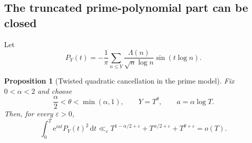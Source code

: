 \documentclass[11pt]{amsart}
\newtheorem{proposition}[theorem]{Proposition}
\theoremstyle{definition}
\theoremstyle{remark}
\newcommand{\dd}{\,\mathrm d}
\newcommand{\ee}{\mathrm e}
\begin{document}
\subsection{The truncated prime-polynomial part can be closed}

Let
\begin{equation}\label{eq:PY}
P_Y(t)=-\frac1\pi\sum_{n\leq Y}
\frac{\Lambda(n)}{\sqrt n\log n}\sin(t\log n).
\end{equation}

\begin{proposition}[Twisted quadratic cancellation in the prime model]
\label{prop:prime_model}
Fix $0<\alpha<2$ and choose
\begin{equation}\label{eq:theta_range}
\frac\alpha2<\theta<\min(\alpha,1),
\qquad Y=T^\theta,
\qquad a=\alpha\log T.
\end{equation}
Then, for every $\varepsilon>0$,
\begin{equation}\label{eq:prime_model_bound}
\int_0^T\ee^{iat}P_Y(t)^2\dd t
\ll_\varepsilon
T^{1-\alpha/2+\varepsilon}
+T^{\alpha/2+\varepsilon}
+T^{\theta+\varepsilon}
=o(T).
\end{equation}
\end{proposition}
\end{document}
